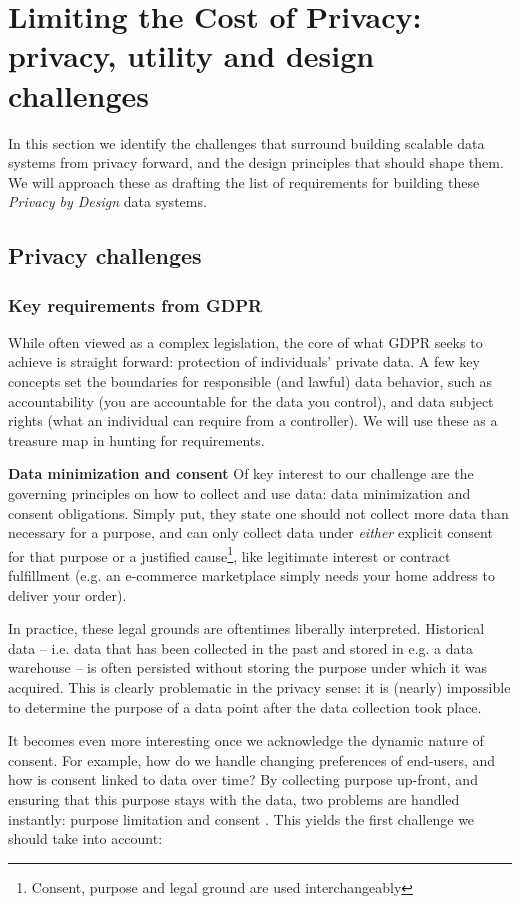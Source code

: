 \documentclass[11pt]{article} %
\begin{document}
\section{Limiting the Cost of Privacy: privacy, utility and design challenges}
In this section we identify the challenges that surround building scalable data systems from privacy forward, and the design principles that should shape them. We will approach these as drafting the list of requirements for building these \textit{Privacy by Design} data systems. 

\subsection{Privacy challenges}
\subsubsection{Key requirements from GDPR}
While often viewed as a complex legislation, the core of what GDPR seeks to achieve is straight forward: protection of individuals' private data. A few key concepts set the boundaries for responsible (and lawful) data behavior, such as accountability (you are accountable for the data you control), and data subject rights (what an individual can require from a controller). We will use these as a treasure map in hunting for requirements. 

\textbf{Data minimization and consent}
Of key interest to our challenge are the governing principles on how to collect and use data: data minimization and consent obligations. Simply put, they state one should not collect more data than necessary for a purpose, and can only collect data under \textit{either} explicit consent for that purpose or a justified cause\footnote{Consent, purpose and legal ground are used interchangeably}, like legitimate interest or contract fulfillment (e.g. an e-commerce marketplace simply needs your home address to deliver your order). 

In practice, these legal grounds are oftentimes liberally interpreted. Historical data -- i.e. data that has been collected in the past and stored in e.g. a data warehouse -- is often persisted without storing the purpose under which it was acquired. This is clearly problematic in the privacy sense: it is (nearly) impossible to determine the purpose of a data point after the data collection took place.

It becomes even more interesting once we acknowledge the dynamic nature of consent. For example, how do we handle changing preferences of end-users, and how is consent linked to data over time? By collecting purpose up-front, and ensuring that this purpose stays with the data, two problems are handled instantly: purpose limitation and consent \cite{soria2016big}. This yields the first challenge we should take into account:
\end{document}
